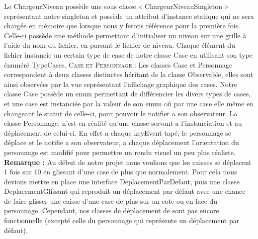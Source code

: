 \documentclass[a4paper,12pt]{article} %
\begin{document}
Le ChargeurNiveau possède une sous classe « ChargeurNiveauSingleton » représentant notre singleton et possède un attribut d’instance statique qui ne sera chargée en mémoire que lorsque nous y ferons référence pour la première fois.
Celle-ci possède une méthode permettant d'initialiser un niveau sur une grille à l'aide du nom du fichier, en parsant le fichier de niveau. Chaque élément du fichier instancie un certain type de case de notre classe Case en utilisant son type énuméré TypeCases.
\newline\newline
\noindent
\textsc{Case et Personnage :}
\newline\newline
Les classes Case et Personnage correspondent à deux classes distinctes héritant de la classe Observable, elles sont ainsi observées par la vue représentant l'affichage graphique des cases.
\newline
Notre classe Case possède un enum permettant de différencier les divers types de cases, et une case est instanciée par la valeur de son enum où par une case elle même en changeant le statut de celle-ci, pour pouvoir le notifier a son observateur.
\newline
La classe Personnage, n’est en réalité qu’une classe servant a l’instanciation et au déplacement de celui-ci. En effet a chaque keyEvent tapé, le personnage se déplace et le notifie a son observateur, a chaque déplacement l’orientation du personnage est modifié pour permettre un rendu visuel un peu plus réaliste.
\newline\newline
\textbf{Remarque :}
\newline\newline
Au début de notre projet nous voulions que les caisses se déplacent 1 fois sur 10 en glissant d’une case de plus que normalement. Pour cela nous devions mettre en place une interface DeplacementParDefaut, puis une classe DeplacementGlissant qui reproduit un déplacement par défaut avec une chance de faire glisser une caisse d’une case de plus sur un cote ou en face du personnage. Cependant, nos classes de déplacement de sont pas encore fonctionnelle (excepté celle du personnage qui représente un déplacement par défaut).
\newpage
\end{document}
